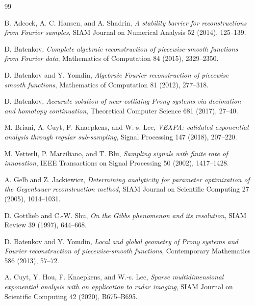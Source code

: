 \documentclass[11pt]{article}
\theoremstyle{remark}
\begin{document}
\begin{thebibliography}{99}

B. Adcock, A. C. Hansen, and A. Shadrin,
\emph{A stability barrier for reconstructions from Fourier samples},
SIAM Journal on Numerical Analysis 52 (2014), 125--139.

D. Batenkov,
\emph{Complete algebraic reconstruction of piecewise-smooth functions from Fourier data},
Mathematics of Computation 84 (2015), 2329--2350.

D. Batenkov and Y. Yomdin,
\emph{Algebraic Fourier reconstruction of piecewise smooth functions},
Mathematics of Computation 81 (2012), 277--318.

D. Batenkov,
\emph{Accurate solution of near-colliding Prony systems via decimation and homotopy continuation},
Theoretical Computer Science 681 (2017), 27--40.

M. Briani, A. Cuyt, F. Knaepkens, and W.-s. Lee,
\emph{VEXPA: validated exponential analysis through regular sub-sampling},
Signal Processing 147 (2018), 207--220.

M. Vetterli, P. Marziliano, and T. Blu,
\emph{Sampling signals with finite rate of innovation},
IEEE Transactions on Signal Processing 50 (2002), 1417--1428.

A. Gelb and Z. Jackiewicz,
\emph{Determining analyticity for parameter optimization of the Gegenbauer reconstruction method},
SIAM Journal on Scientific Computing 27 (2005), 1014--1031.

D. Gottlieb and C.-W. Shu,
\emph{On the Gibbs phenomenon and its resolution},
SIAM Review 39 (1997), 644--668.

D. Batenkov and Y. Yomdin,
\emph{Local and global geometry of Prony systems and Fourier reconstruction of piecewise-smooth functions},
Contemporary Mathematics 586 (2013), 57--72.

A. Cuyt, Y. Hou, F. Knaepkens, and W.-s. Lee,
\emph{Sparse multidimensional exponential analysis with an application to radar imaging},
SIAM Journal on Scientific Computing 42 (2020), B675--B695.

\end{thebibliography}
\end{document}
